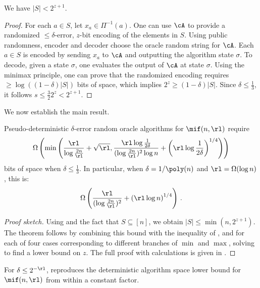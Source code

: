 \begin{itemize}
\begin{itemize}
\begin{lemma}\label{lem:pd-s-le-2zp1}
  We have $|S| < 2^{z+1}$.
\end{lemma}
%
\begin{proof}%
  For each $a \in S$, let $x_a \in \Pi^{-1}(a)$. One can use $\cA$ to provide a randomized $\le\delta$-error, $z$-bit encoding of the elements in $S$. Using public randomness, encoder and decoder choose the oracle random string for $\cA$. Each $a \in S$ is encoded by sending $x_a$ to $\cA$ and outputting the algorithm state $\sigma$. To decode, given a state $\sigma$, one evaluates the output of $\cA$ at state $\sigma$. Using the minimax principle, one can prove that the randomized encoding requires $\ge \log( (1-\delta) |S| )$ bits of space, which implies $2^z \ge (1-\delta) |S|$. Since $\delta \le \frac{1}{3}$, it follows $s \le \frac{3}{2} 2^{z} < 2^{z+1}$.
\end{proof}

We now establish the main result.

\begin{theorem} %
\label{thm:pd-lb-intro}
  Pseudo-deterministic $\delta$-error random oracle algorithms for $\mif(n,\rl)$ require
  \begin{align*}
    \Omega\left(\min\left(\frac{\rl}{\log \frac{2n}{\rl}} + \sqrt{\rl}, \frac{\rl \log \frac{1}{2\delta}}{(\log \frac{2n}{\rl})^2 \log n} + \left(\rl \log \frac{1}{2\delta}\right)^{1/4}\right)\right)
  \end{align*}
  bits of space when $\delta \le \frac{1}{3}$. In particular, when $\delta = 1/\poly(n)$ and $\rl = \Omega(\log n)$, this is:
  \begin{align*}
    \Omega\left(\frac{\rl}{(\log\frac{2 n}{\rl})^2} + \left(\rl \log n\right)^{1/4}\right) \,.
  \end{align*}
\end{theorem}
%
\begin{proof}[Proof sketch]
  Using  and the fact that $S \subseteq [n]$, we obtain
  $|S| \le \min(n, 2^{z+1})$. The theorem follows by combining this bound with
  the inequality of , and for each of four cases
  corresponding to different branches of $\min$ and $\max$, solving to find a
  lower bound on $z$. The full proof with calculations is given in
  .
\end{proof}

\begin{remark}
  For $\delta \le 2^{-\rl}$,  reproduces the
  deterministic algorithm space lower bound for $\mif(n,\rl)$ from
  \cite{Stoeckl23} within a constant factor.
\end{remark}


\end{itemize}
\end{itemize}
